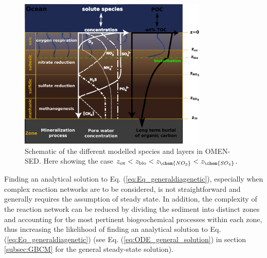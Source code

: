 \documentclass[gmd, manuscript]{copernicus}
\begin{document}
\begin{figure}[htbp]
\begin{center}
	\includegraphics[width=0.8\textwidth]{figures/Sediment-model-with-profiles.pdf}
	\caption{Schematic of the different modelled species and layers in OMEN-SED. Here showing the case $z_{\mathrm{ox}} < z_{\mathrm{bio}} < z_{\chem{NO_3}} < z_{\chem{SO_4}}$.}
	\label{fig:Sediment_layers}
	\end{center}
\end{figure}

Finding an analytical solution to  Eq. (\ref{eq:Eq_generaldiagenetic}), especially when complex reaction networks are to be considered, is not straightforward and generally requires the assumption of steady state. 
In addition, the complexity of the reaction network can be reduced by dividing the sediment into distinct zones and accounting for the most pertinent biogeochemical processes 
within each zone, thus increasing the likelihood of finding an analytical solution to Eq. (\ref{eq:Eq_generaldiagenetic}) (see Eq. (\ref{eq:ODE_general_solution}) in section \ref{subsec:GBCM} for the general steady-state solution). 
\end{document}
